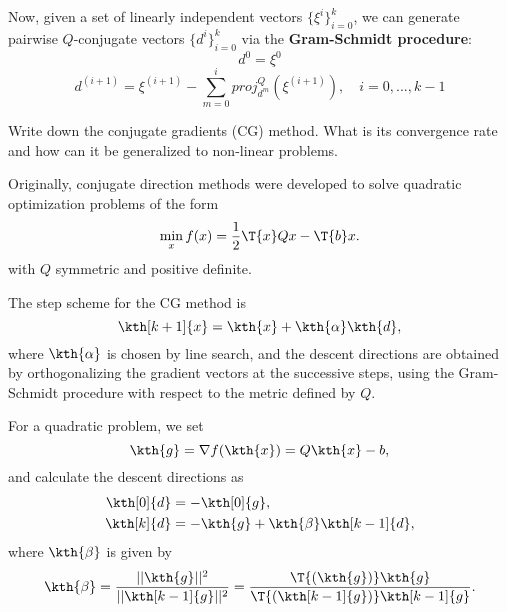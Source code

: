 \documentclass[12pt,a4paper]{article}
\begin{document}
		Now, given a set of linearly independent vectors $\{\xi^i\}^k_{i=0}$, we can generate pairwise $Q$-conjugate vectors $\{d^i\}^k_{i=0}$ via the\textbf{ Gram-Schmidt procedure}:
		$$ d^0 = \xi^0$$
		$$ d^{(i+1)} = \xi^{(i+1)} - \sum_{m = 0}^{i} proj_{d^m}^{Q}(\xi^{(i+1)}), \quad i = 0,...,k-1$$

\begin{question}
 Write down the conjugate gradients (CG) method. What is its convergence rate and how can it be generalized to non-linear problems.

\end{question}

Originally, conjugate direction methods were developed to solve quadratic optimization problems of the form
\begin{equation*}
    \min_x f(x) = \frac{1}{2} \T{x} Q x - \T{b} x.
\end{equation*}
with $Q$ symmetric and positive definite.

The step scheme for the CG method is
\begin{equation*}
  \kth[k+1]{x} = \kth{x} + \kth{\alpha}\kth{d},
\end{equation*}
where $\kth{\alpha}$ is chosen by line search, and the descent directions are obtained by
orthogonalizing the gradient vectors at the successive steps, using the Gram-Schmidt procedure with
respect to the metric defined by \(Q\).

For a quadratic problem, we set
\begin{equation*}
  \kth{g} = \nabla f(\kth{x}) = Q \kth{x} - b,
\end{equation*}
and calculate the descent directions as
\begin{align*}
  \kth[0]{d} &= -\kth[0]{g}, \\
  \kth[k]{d} &= -\kth{g} + \kth{\beta}\kth[k-1]{d},
\end{align*}
where \(\kth{\beta}\) is given by
\begin{equation*}
  \kth{\beta} = \frac{||\kth{g}||^2}{||\kth[k-1]{g}||^2} = \frac{\T{(\kth{g})}\kth{g}}{\T{(\kth[k-1]{g})}\kth[k-1]{g}}.
\end{equation*}
\end{document}
